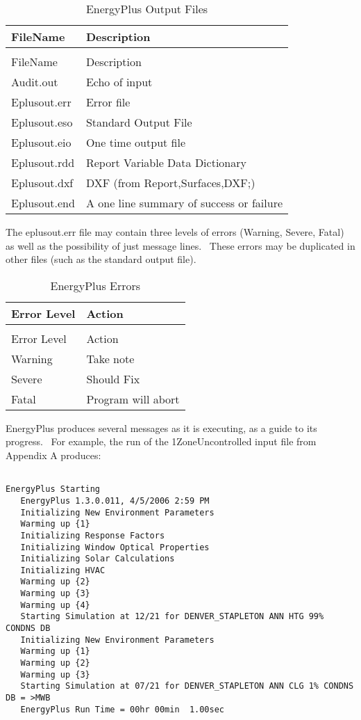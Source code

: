 \begin{longtable}[c]{@{}ll@{}}
\caption{EnergyPlus Output Files \label{table:energyplus-output-files}} \tabularnewline
\toprule 
FileName & Description \tabularnewline
\midrule
\endfirsthead

\caption[]{EnergyPlus Output Files} \tabularnewline
\toprule 
FileName & Description \tabularnewline
\midrule
\endhead

Audit.out & Echo of input \tabularnewline
Eplusout.err & Error file \tabularnewline
Eplusout.eso & Standard Output File \tabularnewline
Eplusout.eio & One time output file \tabularnewline
Eplusout.rdd & Report Variable Data Dictionary \tabularnewline
Eplusout.dxf & DXF (from Report,Surfaces,DXF;) \tabularnewline
Eplusout.end & A one line summary of success or failure \tabularnewline
\bottomrule
\end{longtable}

The eplusout.err file may contain three levels of errors (Warning, Severe, Fatal) as well as the possibility of just message lines.~ These errors may be duplicated in other files (such as the standard output file).

\begin{longtable}[c]{@{}ll@{}}
\caption{EnergyPlus Errors \label{table:energyplus-errors}} \tabularnewline
\toprule 
Error Level & Action \tabularnewline
\midrule
\endfirsthead

\caption[]{EnergyPlus Errors} \tabularnewline
\toprule 
Error Level & Action \tabularnewline
\midrule
\endhead

Warning & Take note \tabularnewline
Severe & Should Fix \tabularnewline
Fatal & Program will abort \tabularnewline
\bottomrule
\end{longtable}

EnergyPlus produces several messages as it is executing, as a guide to its progress.~ For example, the run of the 1ZoneUncontrolled input file from Appendix A produces:

\begin{lstlisting}

EnergyPlus Starting
   EnergyPlus 1.3.0.011, 4/5/2006 2:59 PM
   Initializing New Environment Parameters
   Warming up {1}
   Initializing Response Factors
   Initializing Window Optical Properties
   Initializing Solar Calculations
   Initializing HVAC
   Warming up {2}
   Warming up {3}
   Warming up {4}
   Starting Simulation at 12/21 for DENVER_STAPLETON ANN HTG 99% CONDNS DB
   Initializing New Environment Parameters
   Warming up {1}
   Warming up {2}
   Warming up {3}
   Starting Simulation at 07/21 for DENVER_STAPLETON ANN CLG 1% CONDNS DB = >MWB
   EnergyPlus Run Time = 00hr 00min  1.00sec
\end{lstlisting}


